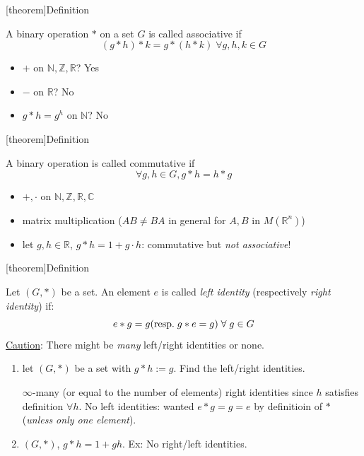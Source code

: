 \documentclass[12pt]{report}
\theoremstyle{definition}
\begin{document}
[theorem]{Definition}
\begin{Associativity}
    A binary operation $*$ on a set $G$ is called associative if\[
        (g*h)*k = g*(h*k) \;\forall g,h,k \in G
    \]
\end{Associativity}

\begin{ex}
    \;

    \begin{itemize}
        \item $+$ on $\mathbb{N, Z, R}$? Yes
        \item $-$ on $\mathbb{R}$? No
        \item $g*h = g^{h}$ on $\mathbb{N}$? No
    \end{itemize}
    
\end{ex}

[theorem]{Definition}
\begin{commutative}
    A binary operation is called commutative if \[
        \forall g, h \in G, g * h = h * g
    \]
\end{commutative}

\begin{ex}
    \;

    \begin{itemize}
        \item $+, \cdot$ on $\mathbb{N, Z, R, C}$
        \item matrix multiplication ($AB \neq BA$ in general for $A, B$ in $M(\mathbb{R}^n)$)
        \item let $g, h \in \mathbb{R}$, $g * h = 1 + g \cdot h$: commutative but \emph{not associative}!
    \end{itemize}
    
\end{ex}

[theorem]{Definition}
\begin{identity element}
    Let $(G, *)$ be a set. An element $e$ is called \emph{left identity} (respectively \emph{right identity}) if:\[
        e * g = g (\textnormal{resp.}\; g * e = g) \;\forall\; g \in G
    \]
    \underline{Caution}: There might be \emph{many} left/right identities or none.
\end{identity element}

\begin{ex}
    \;

    \begin{enumerate}
        \item let $(G,*)$ be a set with $g*h:=g$.
            Find the left/right identities.

            $\infty$-many (or equal to the number of elements)
            right identities since $h$ satisfies definition $\forall h$.
            No left identities: wanted $e * g = g = e$ by definitioin of $*$ (\emph{unless only one element}).
        \item $(G, *)$, $g*h = 1 + gh$. 
            Ex: No right/left identities.
    \end{enumerate}
\end{ex}
\end{document}
